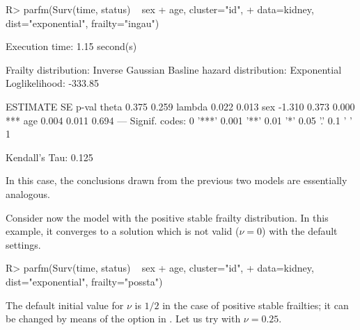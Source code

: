 \begin{CodeChunk}
\begin{CodeInput}
R> parfm(Surv(time, status) ~ sex + age, cluster="id", 
+        data=kidney, dist="exponential", frailty="ingau")
\end{CodeInput}
\begin{CodeOutput}
Execution time: 1.15 second(s)

Frailty distribution: Inverse Gaussian 
Basline hazard distribution: Exponential 
Loglikelihood: -333.85 

       ESTIMATE SE    p-val    
theta   0.375   0.259          
lambda  0.022   0.013          
sex    -1.310   0.373 0.000 ***
age     0.004   0.011 0.694    
---
Signif. codes: 0 '***' 0.001 '**' 0.01 '*' 0.05 '.' 0.1 ' ' 1

Kendall's Tau: 0.125
\end{CodeOutput}
\end{CodeChunk}

In this case, the conclusions drawn from the previous two models are essentially analogous.

Consider now the model with the positive stable frailty distribution.
In this example, it converges to a solution which is not valid ($\nu=0$)
  with the default settings.

\begin{CodeChunk}
\begin{CodeInput}
R> parfm(Surv(time, status) ~ sex + age, cluster="id", 
+        data=kidney, dist="exponential", frailty="possta")
\end{CodeInput}
\end{CodeChunk}

The default initial value for $\nu$ is $1/2$ in the case of positive stable frailties;
 it can be changed by means of the  option in .
Let us try with $\nu= 0.25$.

